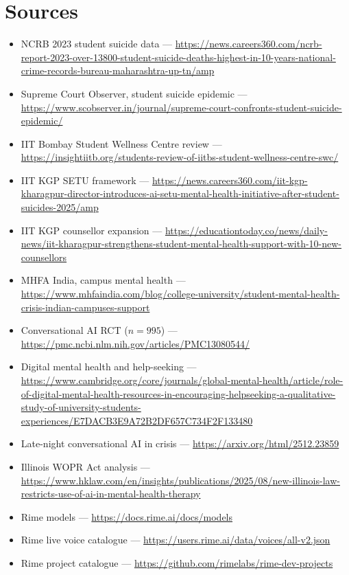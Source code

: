 \documentclass[11pt,a4paper]{article}
\begin{document}
\section*{Sources}
\small
\begin{itemize}[leftmargin=1.1em]
\item NCRB 2023 student suicide data --- \url{https://news.careers360.com/ncrb-report-2023-over-13800-student-suicide-deaths-highest-in-10-years-national-crime-records-bureau-maharashtra-up-tn/amp}
\item Supreme Court Observer, student suicide epidemic --- \url{https://www.scobserver.in/journal/supreme-court-confronts-student-suicide-epidemic/}
\item IIT Bombay Student Wellness Centre review --- \url{https://insightiitb.org/students-review-of-iitbs-student-wellness-centre-swc/}
\item IIT KGP SETU framework --- \url{https://news.careers360.com/iit-kgp-kharagpur-director-introduces-ai-setu-mental-health-initiative-after-student-suicides-2025/amp}
\item IIT KGP counsellor expansion --- \url{https://educationtoday.co/news/daily-news/iit-kharagpur-strengthens-student-mental-health-support-with-10-new-counsellors}
\item MHFA India, campus mental health --- \url{https://www.mhfaindia.com/blog/college-university/student-mental-health-crisis-indian-campuses-support}
\item Conversational AI RCT ($n=995$) --- \url{https://pmc.ncbi.nlm.nih.gov/articles/PMC13080544/}
\item Digital mental health and help-seeking --- \url{https://www.cambridge.org/core/journals/global-mental-health/article/role-of-digital-mental-health-resources-in-encouraging-helpseeking-a-qualitative-study-of-university-students-experiences/E7DACB3E9A72B2DF657C734F2F133480}
\item Late-night conversational AI in crisis --- \url{https://arxiv.org/html/2512.23859}
\item Illinois WOPR Act analysis --- \url{https://www.hklaw.com/en/insights/publications/2025/08/new-illinois-law-restricts-use-of-ai-in-mental-health-therapy}
\item Rime models --- \url{https://docs.rime.ai/docs/models}
\item Rime live voice catalogue --- \url{https://users.rime.ai/data/voices/all-v2.json}
\item Rime project catalogue --- \url{https://github.com/rimelabs/rime-dev-projects}

\end{itemize}
\end{document}
